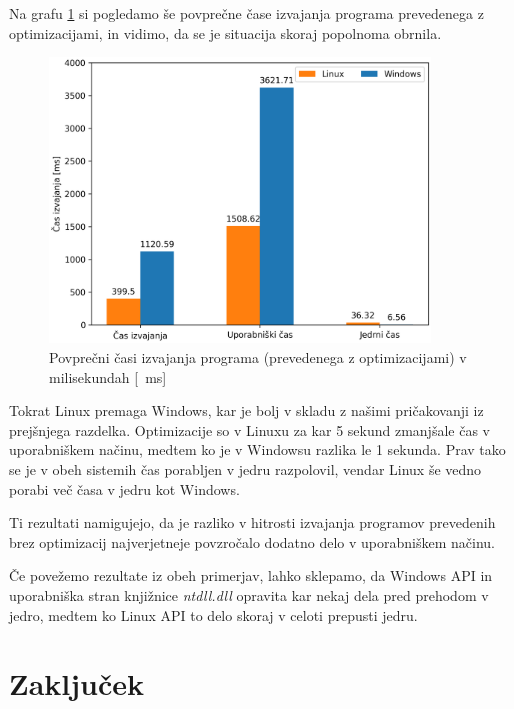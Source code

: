 \documentclass[a4paper,12pt,openright]{book}
\begin{document}
Na grafu \ref{fig:program_comparison:optimized_times} si pogledamo še povprečne čase izvajanja programa prevedenega z optimizacijami, in vidimo, da se je situacija skoraj popolnoma obrnila.

\begin{figure}[h!]
	\begin{center}
		\includegraphics[width=0.9\textwidth]{images/program_comparison_optimized.png}
	\end{center}
	\caption{Povprečni časi izvajanja programa (prevedenega z optimizacijami) v milisekundah [\SI{}{\milli\second}]}
	\label{fig:program_comparison:optimized_times}
\end{figure}

Tokrat Linux premaga Windows, kar je bolj v skladu z našimi pričakovanji iz prejšnjega razdelka.
Optimizacije so v Linuxu za kar 5 sekund zmanjšale čas v uporabniškem načinu, medtem ko je v Windowsu razlika le 1 sekunda.
Prav tako se je v obeh sistemih čas porabljen v jedru razpolovil, vendar Linux še vedno porabi več časa v jedru kot Windows.

Ti rezultati namigujejo, da je razliko v hitrosti izvajanja programov prevedenih brez optimizacij najverjetneje povzročalo dodatno delo v uporabniškem načinu.

Če povežemo rezultate iz obeh primerjav, lahko sklepamo, da Windows API in uporabniška stran knjižnice \textit{ntdll.dll} opravita kar nekaj dela pred prehodom v jedro, medtem ko Linux API to delo skoraj v celoti prepusti jedru.

\chapter{Zaključek}
\end{document}
